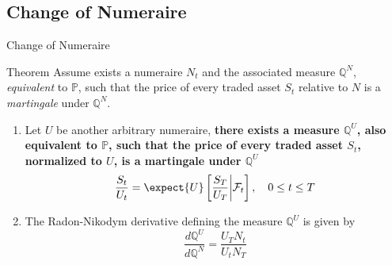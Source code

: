 \documentclass{beamer}
\begin{document}
	\subsection{Change of Numeraire}
	\begin{frame}{Change of Numeraire}
		\begin{block}{Theorem}
			Assume exists a numeraire $N_t$ and the associated measure $\mathbb{Q}^N$, \textit{equivalent} to $\mathbb{P}$, such that the price of every traded asset $S_t$ relative to $N$ is a \textit{martingale} under $\mathbb{Q}^N$.
			\begin{enumerate}
			\item Let $U$ be another arbitrary numeraire, \textbf{there exists a measure $\mathbb{Q}^U$, also equivalent to $\mathbb{P}$, such that the price of every traded asset $S_t$, normalized to $U$, is a martingale under $\mathbb{Q}^U$}
			\begin{equation*}
				\frac{S_t}{U_t} = \expect{U}\left[\frac{S_T}{U_T}\bigg|\mathcal{F}_t\right],\quad 0\le t \le T
			\end{equation*}
			\item The Radon-Nikodym derivative defining the measure $\mathbb{Q}^U$ is given by
			\begin{equation}
				\frac{d\mathbb{Q}^U}{d\mathbb{Q}^N} = \frac{U_T N_t}{U_t N_T}
				\label{eq:radon_nikodym_der2}
			\end{equation}
			\end{enumerate}
		\end{block}
	\end{frame}
\end{document}
